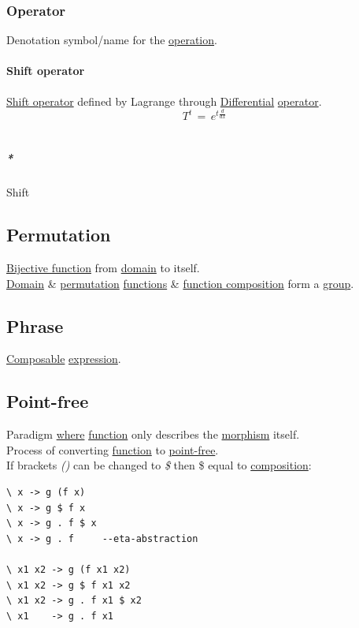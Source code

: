 \documentclass[11pt]{article}
\begin{document}
\subsubsection{\label{org28ae05d}Operator}
\label{sec:orge808526}
Denotation symbol/name for the \hyperref[org1173fe8]{operation}.\\

\paragraph{\label{org4712978}Shift operator}
\label{sec:org43f75a8}
\hyperref[org4712978]{Shift operator} defined by Lagrange through \hyperref[org04feaf6]{Differential} \hyperref[org28ae05d]{operator}.\\
$$ T^{t} \, = \, e^{t{\frac{d}{dx}}} $$\\

\subparagraph{\emph{*}}
\label{sec:org6761007}

Shift\\

\subsection{\label{org2357754}Permutation}
\label{sec:orgbbda491}
\hyperref[orgb12b677]{Bijective function} from \hyperref[org494b48a]{domain} to itself.\\

\hyperref[org494b48a]{Domain} \& \hyperref[org2357754]{permutation} \hyperref[orgaa8fb87]{functions} \& \hyperref[org3802537]{function composition} form a \hyperref[orgc937439]{group}.\\

\subsection{\label{org635d2a0}Phrase}
\label{sec:org0e44b75}
\hyperref[org99d574f]{Composable} \hyperref[org9021dd7]{expression}.\\

\subsection{\label{org1638f37}Point-free}
\label{sec:org4f29c66}
Paradigm \hyperref[org3e5903d]{where} \hyperref[orge15bc14]{function} only describes the \hyperref[org5de09d4]{morphism} itself.\\

Process of converting \hyperref[orge15bc14]{function} to \hyperref[org1638f37]{point-free}.\\
If brackets \emph{()} can be changed to \emph{\$} then \$ equal to \hyperref[orga128e7f]{composition}:\\
\begin{verbatim}
\ x -> g (f x)
\ x -> g $ f x
\ x -> g . f $ x
\ x -> g . f     --eta-abstraction

\ x1 x2 -> g (f x1 x2)
\ x1 x2 -> g $ f x1 x2
\ x1 x2 -> g . f x1 $ x2
\ x1    -> g . f x1
\end{verbatim}
\end{document}
